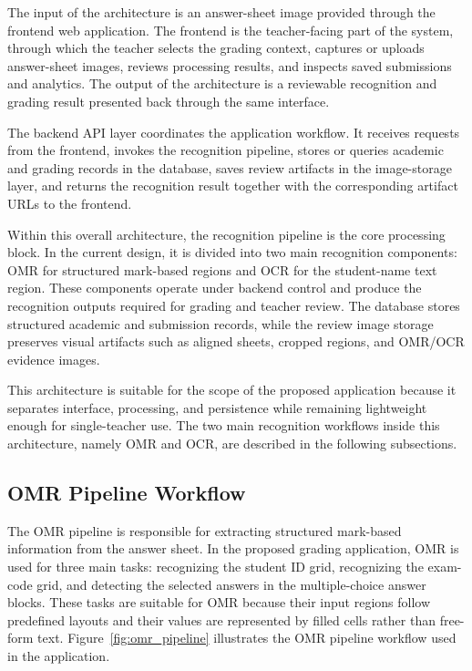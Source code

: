 \documentclass[../Main.tex]{subfiles}
\begin{document}
The input of the architecture is an answer-sheet image provided through the
frontend web application. The frontend is the teacher-facing part of the
system, through which the teacher selects the grading context, captures or
uploads answer-sheet images, reviews processing results, and inspects saved
submissions and analytics. The output of the architecture is a reviewable
recognition and grading result presented back through the same interface.

The backend API layer coordinates the application workflow. It receives
requests from the frontend, invokes the recognition pipeline, stores or queries
academic and grading records in the database, saves review artifacts in the
image-storage layer, and returns the recognition result together with the
corresponding artifact URLs to the frontend.

Within this overall architecture, the recognition pipeline is the core
processing block. In the current design, it is divided into two main
recognition components: OMR for structured mark-based regions and OCR for the
student-name text region. These components operate under backend control and
produce the recognition outputs required for grading and teacher review. The
database stores structured academic and submission records, while the review
image storage preserves visual artifacts such as aligned sheets, cropped
regions, and OMR/OCR evidence images.

This architecture is suitable for the scope of the proposed application because
it separates interface, processing, and persistence while remaining lightweight
enough for single-teacher use. The two main recognition workflows inside this
architecture, namely OMR and OCR, are described in the following subsections.

\subsection{OMR Pipeline Workflow}
\label{subsection:4.1.2}

The OMR pipeline is responsible for extracting structured mark-based information
from the answer sheet. In the proposed grading application, OMR is used for
three main tasks: recognizing the student ID grid, recognizing the exam-code
grid, and detecting the selected answers in the multiple-choice answer blocks.
These tasks are suitable for OMR because their input regions follow predefined
layouts and their values are represented by filled cells rather than free-form
text. Figure~\ref{fig:omr_pipeline} illustrates the OMR pipeline workflow used
in the application.
\end{document}
